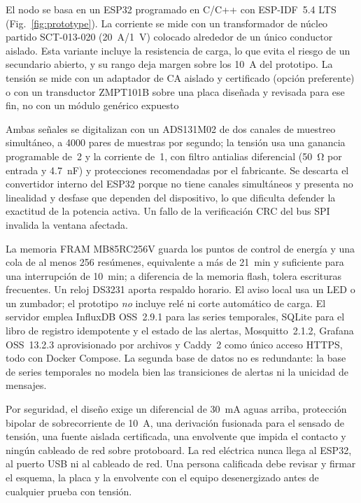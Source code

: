 El nodo se basa en un ESP32 programado en C/C++ con ESP-IDF~5.4 LTS (Fig.~\ref{fig:prototype}).
La corriente se mide con un transformador de núcleo partido SCT-013-020 (\SI{20}{A}/\SI{1}{V}) colocado alrededor de un único conductor aislado.
Esta variante incluye la resistencia de carga, lo que evita el riesgo de un secundario abierto, y su rango deja margen sobre los \SI{10}{A} del prototipo.
La tensión se mide con un adaptador de CA aislado y certificado (opción preferente) o con un transductor ZMPT101B sobre una placa diseñada y revisada para ese fin, no con un módulo genérico expuesto~

Ambas señales se digitalizan con un ADS131M02 de dos canales de muestreo simultáneo, a \num{4000} pares de muestras por segundo; la tensión usa una ganancia programable de~2 y la corriente de~1, con filtro antialias diferencial (\SI{50}{\ohm} por entrada y \SI{4,7}{nF}) y protecciones recomendadas por el fabricante.
Se descarta el convertidor interno del ESP32 porque no tiene canales simultáneos y presenta no linealidad y desfase que dependen del dispositivo, lo que dificulta defender la exactitud de la potencia activa.
Un fallo de la verificación CRC del bus SPI invalida la ventana afectada.

La memoria FRAM MB85RC256V guarda los puntos de control de energía y una cola de al menos \num{256} resúmenes, equivalente a más de \SI{21}{min} y suficiente para una interrupción de \SI{10}{min}; a diferencia de la memoria flash, tolera escrituras frecuentes.
Un reloj DS3231 aporta respaldo horario.
El aviso local usa un LED o un zumbador; el prototipo \emph{no} incluye relé ni corte automático de carga.
El servidor emplea InfluxDB OSS~2.9.1 para las series temporales, SQLite para el libro de registro idempotente y el estado de las alertas, Mosquitto~2.1.2, Grafana OSS~13.2.3 aprovisionado por archivos y Caddy~2 como único acceso HTTPS, todo con Docker Compose.
La segunda base de datos no es redundante: la base de series temporales no modela bien las transiciones de alertas ni la unicidad de mensajes.

Por seguridad, el diseño exige un diferencial de \SI{30}{mA} aguas arriba, protección bipolar de sobrecorriente de \SI{10}{A}, una derivación fusionada para el sensado de tensión, una fuente aislada certificada, una envolvente que impida el contacto y ningún cableado de red sobre protoboard.
La red eléctrica nunca llega al ESP32, al puerto USB ni al cableado de red.
Una persona calificada debe revisar y firmar el esquema, la placa y la envolvente con el equipo desenergizado antes de cualquier prueba con tensión.

